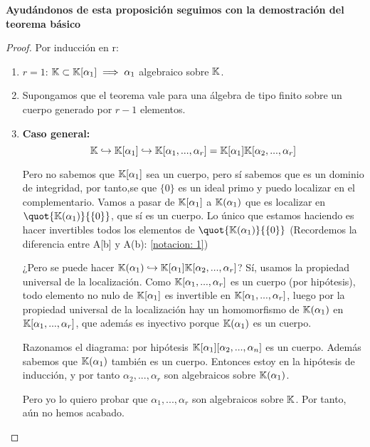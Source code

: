\textbf{Ayudándonos de esta proposición seguimos con la demostración del teorema básico}
\begin{proof}
	Por inducción en r:
	\begin{enumerate}
		\item $r=1$: $\mathbb{K} \subset \mathbb{K}[\alpha_1] \implies \alpha_1$ algebraico sobre $\mathbb{K}$.
		\item Supongamos que el teorema vale para una álgebra de tipo finito sobre un cuerpo generado por $r-1$ elementos.
		\item \textbf{Caso general:}
		$$\mathbb{K} \hookrightarrow \mathbb{K}[\alpha_1] \hookrightarrow \mathbb{K}[\alpha_1,...,\alpha_r]=\mathbb{K}[\alpha_1]\mathbb{K}[\alpha_2,...,\alpha_r]$$

		Pero no sabemos que $\mathbb{K}[\alpha_1]$ sea un cuerpo, pero sí sabemos que es un dominio de integridad, por tanto,se que $\{0\}$ es un ideal primo y puedo localizar en el complementario. Vamos a pasar de $\mathbb{K}[\alpha_1]$ a $\mathbb{K}(\alpha_1)$ que es localizar en $\quot{\K(\alpha_1)}{\{0\}}$, que sí es un cuerpo. Lo único que estamos haciendo es hacer invertibles todos los elementos de $\quot{\K(\alpha_1)}{\{0\}}$ (Recordemos la diferencia entre A[b] y A(b): \ref{notacion: 1})

		¿Pero se puede hacer $\mathbb{K}(\alpha_1) \hookrightarrow \mathbb{K}[\alpha_1]\mathbb{K}[\alpha_2,...,\alpha_r]$?  Sí, usamos la propiedad universal de la localización. Como $\mathbb{K}[\alpha_1,...,\alpha_r]$ es un cuerpo (por hipótesis), todo elemento no nulo de $\mathbb{K}[\alpha_1]$ es invertible en $\mathbb{K}[\alpha_1,...,\alpha_r]$, luego por la propiedad universal de la localización hay un homomorfismo de $\mathbb{K}(\alpha_1)$ en $\mathbb{K}[\alpha_1,...,\alpha_r]$, que además es inyectivo porque $\mathbb{K}(\alpha_1)$ es un cuerpo.
		
		
		Razonamos el diagrama: por hipótesis $\mathbb{K}[\alpha_1][\alpha_2,...,\alpha_n]$ es un cuerpo. Además sabemos que  $\mathbb{K}(\alpha_1)$ también es un cuerpo. Entonces estoy en la hipótesis de inducción, y por tanto $\alpha_2,...,\alpha_r$ son algebraicos sobre $\mathbb{K}(\alpha_1)$.
		
		Pero yo lo quiero probar que $\alpha_1,..., \alpha_r$ son algebraicos sobre $\mathbb{K}$. Por tanto, aún no hemos acabado.
		

\end{enumerate}
\end{proof}
